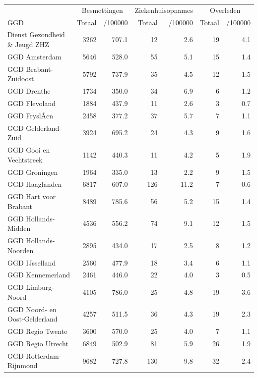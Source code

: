 \documentclass[
  english,
  man,floatsintext]{apa6}
\begin{document}
\begin{table}
\centering\begingroup\fontsize{10}{12}\selectfont

\begin{threeparttable}
\begin{tabular}{lrrrrrr}
\toprule
\multicolumn{1}{c}{ } & \multicolumn{2}{c}{Besmettingen} & \multicolumn{2}{c}{Ziekenhuisopnames} & \multicolumn{2}{c}{Overleden} \\
\cmidrule(l{3pt}r{3pt}){2-3} \cmidrule(l{3pt}r{3pt}){4-5} \cmidrule(l{3pt}r{3pt}){6-7}
GGD & Totaal & /100000 & Totaal & /100000 & Totaal & /100000\\
\midrule
Dienst Gezondheid \& Jeugd ZHZ & 3262 & 707.1 & 12 & 2.6 & 19 & 4.1\\
GGD Amsterdam & 5646 & 528.0 & 55 & 5.1 & 15 & 1.4\\
GGD Brabant-Zuidoost & 5792 & 737.9 & 35 & 4.5 & 12 & 1.5\\
GGD Drenthe & 1734 & 350.0 & 34 & 6.9 & 6 & 1.2\\
GGD Flevoland & 1884 & 437.9 & 11 & 2.6 & 3 & 0.7\\
GGD FryslÃ¢n & 2458 & 377.2 & 37 & 5.7 & 7 & 1.1\\
GGD Gelderland-Zuid & 3924 & 695.2 & 24 & 4.3 & 9 & 1.6\\
GGD Gooi en Vechtstreek & 1142 & 440.3 & 11 & 4.2 & 5 & 1.9\\
GGD Groningen & 1964 & 335.0 & 13 & 2.2 & 9 & 1.5\\
GGD Haaglanden & 6817 & 607.0 & 126 & 11.2 & 7 & 0.6\\
GGD Hart voor Brabant & 8489 & 785.6 & 56 & 5.2 & 15 & 1.4\\
GGD Hollands-Midden & 4536 & 556.2 & 74 & 9.1 & 12 & 1.5\\
GGD Hollands-Noorden & 2895 & 434.0 & 17 & 2.5 & 8 & 1.2\\
GGD IJsselland & 2560 & 477.9 & 18 & 3.4 & 6 & 1.1\\
GGD Kennemerland & 2461 & 446.0 & 22 & 4.0 & 3 & 0.5\\
GGD Limburg-Noord & 4105 & 786.0 & 25 & 4.8 & 19 & 3.6\\
GGD Noord- en Oost-Gelderland & 4257 & 511.5 & 36 & 4.3 & 19 & 2.3\\
GGD Regio Twente & 3600 & 570.0 & 25 & 4.0 & 7 & 1.1\\
GGD Regio Utrecht & 6849 & 502.9 & 81 & 5.9 & 26 & 1.9\\
GGD Rotterdam-Rijnmond & 9682 & 727.8 & 130 & 9.8 & 32 & 2.4\\

\end{tabular}
\end{threeparttable}
\end{table}
\end{document}
